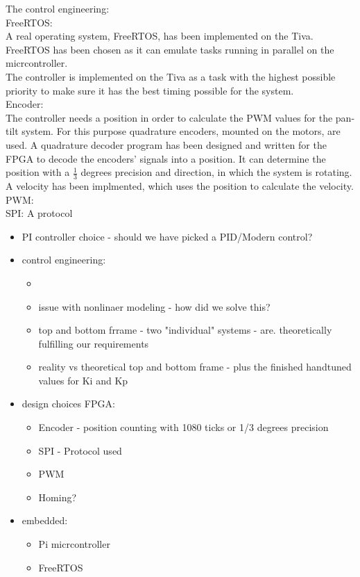\documentclass[../../main]{subfiles}
\begin{document}
The control engineering: \\

FreeRTOS:\\
A real operating system, FreeRTOS, has been implemented on the Tiva. FreeRTOS has been chosen as it can emulate tasks running in parallel on the micrcontroller. \\
The controller is implemented on the Tiva as a task with the highest possible priority to make sure it has the best timing possible for the system.
\\

Encoder:\\
The controller needs a position in order to calculate the PWM values for the pan-tilt system. For this purpose quadrature encoders, mounted on the motors, are used.
A quadrature decoder program has been designed and written for the FPGA to decode the encoders' signals into a position.
It can determine the position with a $\frac{1}{3}$ degrees precision and direction, in which the system is rotating. A velocity has been implmented, which uses the position to calculate the velocity.
\\

PWM:\\

SPI:
A protocol


\begin{itemize}
  \item PI controller choice - should we have picked a PID/Modern control?
  \item control engineering:
  \begin{itemize}
    \item
    \item issue with nonlinaer modeling - how did we solve this?
    \item top and bottom frrame - two "individual" systems - are. theoretically fulfilling our requirements
    \item reality vs theoretical top and bottom frame - plus the finished handtuned values for Ki and Kp
  \end{itemize}
  \item design choices FPGA:
    \begin{itemize}
      \item Encoder - position counting with 1080 ticks or 1/3 degrees precision
      \item SPI - Protocol used
      \item PWM
      \item Homing?
    \end{itemize}
  \item embedded:
  \begin{itemize}
    \item Pi micrcontroller
    \item FreeRTOS
  \end{itemize}


\end{itemize}
\end{document}
